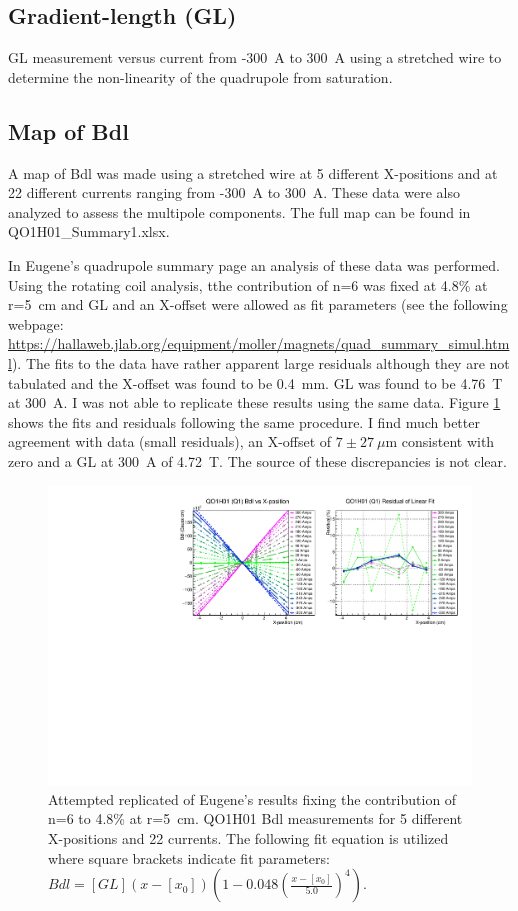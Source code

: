 \documentclass[12pt]{article}
\begin{document}
\subsection{Gradient-length (GL)}
GL measurement versus current from -300~A to 300~A using a stretched wire to determine the non-linearity of the quadrupole from saturation. 
\subsection{Map of Bdl}
A map of Bdl was made using a stretched wire at 5 different X-positions and at 22 different currents ranging from -300~A to 300~A. These data were also analyzed to assess the multipole components. The full map can be found in QO1H01\_Summary1.xlsx. 

In Eugene's quadrupole summary page an analysis of these data was performed. Using the rotating coil analysis, tthe contribution of n=6 was fixed at 4.8\% at r=5~cm and GL and an X-offset were allowed as fit parameters (see the following webpage: \href{https://hallaweb.jlab.org/equipment/moller/magnets/quad_summary_simul.html}{https://hallaweb.jlab.org/equipment/moller/magnets/quad\_summary\_simul.html}). The fits to the data have rather apparent large residuals although they are not tabulated and the X-offset was found to be 0.4~mm. GL was found to be 4.76~T at 300~A. I was not able to replicate these results using the same data. Figure \ref{fig:EugeneComp} shows the fits and residuals following the same procedure. I find much better agreement with data (small residuals), an X-offset of $7\pm27~\mu$m consistent with zero and a GL at 300~A of 4.72~T. The source of these discrepancies is not clear.
\begin{figure}[!h]
\centering
\includegraphics[width=1\textwidth]{EugeneCompNewQ1.pdf}
\caption{\label{fig:EugeneComp}Attempted replicated of Eugene's results fixing the contribution of n=6 to 4.8\% at r=5~cm. QO1H01 Bdl measurements for 5 different X-positions and 22 currents. The following fit equation is utilized where square brackets indicate fit parameters: $Bdl=[GL](x-[x_0])\left(1-0.048\left(\frac{x-[x_0]}{5.0}\right)^4\right)$.}
\end{figure}
\end{document}
